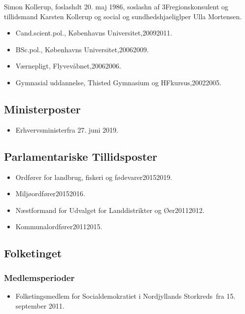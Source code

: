\documentclass[11pt, a4paper]{awesome-cv}
\begin{document}
\makecvheader[R]
\makelettertitle
\begin{cvletter}
Simon Kollerup, foslashdt 20. maj 1986, soslashn af 3Fregionskonsulent og tillidsmand Karsten Kollerup og social og sundhedshjaeliglper Ulla Mortensen.

\begin{itemize}
\item Cand.scient.pol., Københavns Universitet,20092011.
\item BSc.pol., Københavns Universitet,20062009.
\item Værnepligt, Flyvevåbnet,20062006.
\item Gymnasial uddannelse, Thisted Gymnasium og HFkursus,20022005.
\end{itemize}
\subsection*{Ministerposter}
\begin{itemize}
\item Erhvervsministerfra 27. juni 2019.
\end{itemize}
\subsection*{Parlamentariske Tillidsposter}
\begin{itemize}
\item Ordfører for landbrug, fiskeri og fødevarer20152019.
\item Miljøordfører20152016.
\item Næstformand for Udvalget for Landdistrikter og Øer20112012.
\item Kommunalordfører20112015.
\end{itemize}
\subsection*{Folketinget}
\subsubsection*{Medlemsperioder}
\begin{itemize}
\item Folketingsmedlem for Socialdemokratiet i Nordjyllands Storkreds fra 15. september 2011.
\end{itemize}

\end{cvletter}
\end{document}
